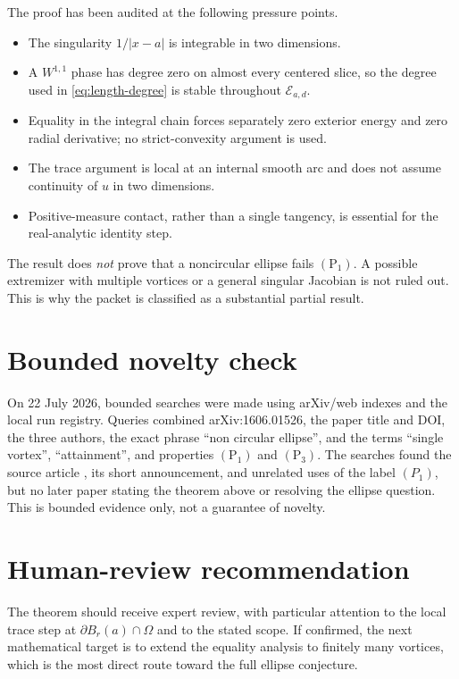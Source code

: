 \documentclass[11pt]{article}
\newcommand{\Ead}{\mathcal E_{a,d}}
\begin{document}
The proof has been audited at the following pressure points.
\begin{itemize}
 \item The singularity $1/|x-a|$ is integrable in two dimensions.
 \item A $W^{1,1}$ phase has degree zero on almost every centered slice, so
       the degree used in \eqref{eq:length-degree} is stable throughout
       $\Ead$.
 \item Equality in the integral chain forces separately zero exterior energy
       and zero radial derivative; no strict-convexity argument is used.
 \item The trace argument is local at an internal smooth arc and does not
       assume continuity of $u$ in two dimensions.
 \item Positive-measure contact, rather than a single tangency, is essential
       for the real-analytic identity step.
\end{itemize}

The result does \emph{not} prove that a noncircular ellipse fails
$(\mathrm P_1)$. A possible extremizer with multiple vortices or a general
singular Jacobian is not ruled out. This is why the packet is classified as a
substantial partial result.

\section{Bounded novelty check}

On 22 July 2026, bounded searches were made using arXiv/web indexes and the
local run registry. Queries combined arXiv:1606.01526, the paper title and
DOI, the three authors, the exact phrase ``non circular ellipse'', and the
terms ``single vortex'', ``attainment'', and properties $(\mathrm P_1)$ and
$(\mathrm P_3)$. The searches found the source article \cite{BMS}, its short
announcement, and unrelated uses of the label $(P_1)$, but no later paper
stating the theorem above or resolving the ellipse question. This is bounded
evidence only, not a guarantee of novelty.

\section{Human-review recommendation}

The theorem should receive expert review, with particular attention to the
local trace step at $\partial B_r(a)\cap\Omega$ and to the stated scope. If
confirmed, the next mathematical target is to extend the equality analysis to
finitely many vortices, which is the most direct route toward the full ellipse
conjecture.
\end{document}
